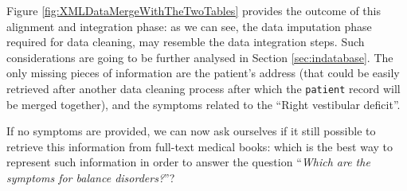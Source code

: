 Figure \ref{fig:XMLDataMergeWithTheTwoTables} provides the outcome of this alignment and integration phase: as we can see, the data imputation phase required for data cleaning, may resemble the data integration steps. Such considerations are going to be further analysed in Section \ref{sec:indatabase}. The only missing pieces of information are the patient's address (that could be easily retrieved after another data cleaning process after which the \texttt{patient} record will be merged together), and the symptoms related to the ``Right vestibular deficit''. 

If no symptoms are provided, we can now ask ourselves if it still possible to retrieve this information from full-text medical books: which is the best way to represent such information in order to answer the question ``\textit{Which are the symptoms for balance disorders?}''?



